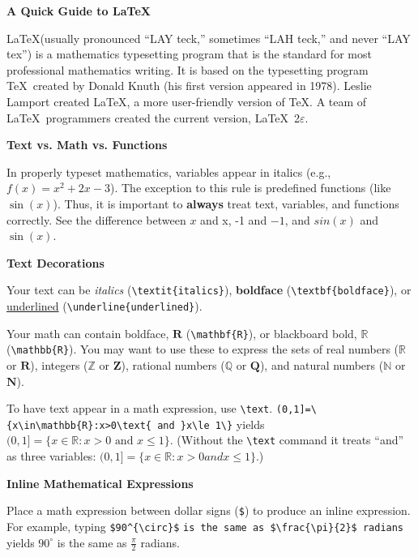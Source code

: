 \documentclass[10pt,landscape]{article}
\newcommand{\ColorSection}[1]{\par\vspace{1.5ex}\noindent\textcolor{sectioncolor}{\Large\bfseries #1}\par\vspace{0.75ex}}
\newcommand{\ColorSubsection}[1]{\par\vspace{1ex}\noindent\textcolor{subsectioncolor}{\normalsize\bfseries #1}\par\vspace{0.5ex}}
\begin{document}
\raggedright
\footnotesize


\begin{center}
\textcolor{titlecolor}{\Huge\bfseries A Quick Guide to \LaTeX}
\end{center}
\begin{multicols}{3}
\setlength{\premulticols}{1pt}
\setlength{\postmulticols}{1pt}
\setlength{\multicolsep}{1pt}
\setlength{\columnsep}{2pt}


\begin{tcolorbox}[notebox, title=What is \LaTeX?]
\LaTeX (usually pronounced ``LAY teck,'' sometimes ``LAH teck,'' and never ``LAY tex'') is a mathematics typesetting program that is the standard for most professional mathematics writing. It is based on the typesetting program \TeX\ created by Donald Knuth (his first version appeared in 1978). Leslie Lamport created \LaTeX, a more user-friendly version of \TeX. A team of \LaTeX\ programmers created the current version,  \LaTeX~2$\varepsilon$.
\end{tcolorbox}



\ColorSection{Text vs. Math vs. Functions}
In properly typeset mathematics, variables appear in italics (e.g., $f(x)=x^{2}+2x-3$). The exception to this rule is predefined functions (like $\sin (x)$). Thus, it is important to \textbf{always} treat text, variables, and functions correctly. See the difference between $x$ and x, -1 and $-1$, and $sin(x)$ and $\sin(x)$.  

\ColorSubsection{Text Decorations}
Your text can be \textit{italics} (\verb!\textit{italics}!), \textbf{boldface} (\verb!\textbf{boldface}!), or \underline{underlined} (\verb!\underline{underlined}!).

Your math can contain boldface, $\mathbf{R}$ (\verb!\mathbf{R}!), or blackboard bold, $\mathbb{R}$ (\verb!\mathbb{R}!). You may want to use these to express the sets of real numbers ($\mathbb{R}$ or $\mathbf{R}$), integers ($\mathbb{Z}$ or $\mathbf{Z}$), rational numbers ($\mathbb{Q}$ or $\mathbf{Q}$), and natural numbers ($\mathbb{N}$ or $\mathbf{N}$).

To have text appear in a math expression, use \verb!\text!. \verb!(0,1]=\{x\in\mathbb{R}:x>0\text{ and }x\le 1\}! yields $(0,1]=\{x\in\mathbb{R}:x>0\text{ and }x\le 1\}$. (Without the \verb!\text! command it treats ``and'' as three variables: $(0,1]=\{x\in\mathbb{R}:x>0 and x\le 1\}$.)

\ColorSubsection{Inline Mathematical Expressions}
Place a math expression between dollar signs (\verb!$!) to produce an inline expression.  For example, typing \verb!$90^{\circ}$! \verb!is the same as $\frac{\pi}{2}$ radians!  yields $90^{\circ}$ is the same as $\frac{\pi}{2}$ radians.


\end{multicols}
\end{document}
